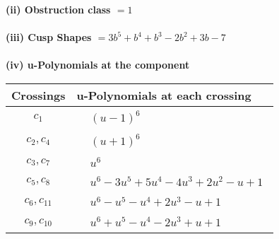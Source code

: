 \documentclass[1p]{elsarticle_modified}
\theoremstyle{definition}
\begin{document}
\flushleft \textbf{(ii) Obstruction class $= 1$}\\~\\
\flushleft \textbf{(iii) Cusp Shapes $= 3 b^5+b^4+b^3-2 b^2+3 b-7$}\\~\\
\newpage\renewcommand{\arraystretch}{1}
\flushleft \textbf{(iv) u-Polynomials at the component}\newline \\
\begin{tabular}{m{50pt}|m{274pt}}
Crossings & \hspace{64pt}u-Polynomials at each crossing \\
\hline $$\begin{aligned}c_{1}\end{aligned}$$&$\begin{aligned}
&(u-1)^6
\end{aligned}$\\
\hline $$\begin{aligned}c_{2},c_{4}\end{aligned}$$&$\begin{aligned}
&(u+1)^6
\end{aligned}$\\
\hline $$\begin{aligned}c_{3},c_{7}\end{aligned}$$&$\begin{aligned}
&u^6
\end{aligned}$\\
\hline $$\begin{aligned}c_{5},c_{8}\end{aligned}$$&$\begin{aligned}
&u^6-3 u^5+5 u^4-4 u^3+2 u^2- u+1
\end{aligned}$\\
\hline $$\begin{aligned}c_{6},c_{11}\end{aligned}$$&$\begin{aligned}
&u^6- u^5- u^4+2 u^3- u+1
\end{aligned}$\\
\hline $$\begin{aligned}c_{9},c_{10}\end{aligned}$$&$\begin{aligned}
&u^6+u^5- u^4-2 u^3+u+1
\end{aligned}$\\
\hline
\end{tabular}\\~\\
\end{document}
